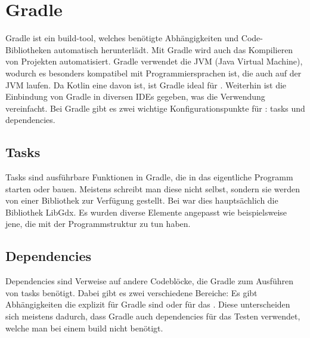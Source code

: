 
\renewcommand{\kapitelautor}{Autor: Felix Zwickelstorfer}
\section{Gradle}\label{sec:gradle}

\renewcommand{\kapitelautor}{Autor: Felix Zwickelstorfer}

Gradle ist ein build-tool, welches benötigte Abhängigkeiten und Code-Bibliotheken automatisch herunterlädt.
Mit Gradle wird auch das Kompilieren von Projekten automatisiert.
Gradle verwendet die JVM (Java Virtual Machine), wodurch es besonders kompatibel mit Programmiersprachen ist, die auch auf der JVM laufen.
Da Kotlin eine davon ist, ist Gradle ideal für \FF.
Weiterhin ist die Einbindung von Gradle in diversen IDEs gegeben, was die Verwendung vereinfacht.
Bei Gradle gibt es zwei wichtige Konfigurationspunkte für \FF: tasks und dependencies. 

\subsection{Tasks}\label{subsec:tasks}

Tasks sind ausführbare Funktionen in Gradle, die in \FF das eigentliche Programm starten oder bauen.
Meistens schreibt man diese nicht selbst, sondern sie werden von einer Bibliothek zur Verfügung gestellt.
Bei \FF war dies hauptsächlich die Bibliothek LibGdx.
Es wurden diverse Elemente angepasst wie beispielsweise jene, die mit der Programmstruktur zu tun haben.

\subsection{Dependencies}\label{subsec:dependencies}

Dependencies sind Verweise auf andere Codeblöcke, die Gradle zum Ausführen von tasks benötigt.
Dabei gibt es zwei verschiedene Bereiche: Es gibt Abhängigkeiten die explizit für Gradle sind oder für das .
Diese unterscheiden sich meistens dadurch, dass Gradle auch dependencies für das Testen verwendet, welche man bei einem build nicht benötigt.
